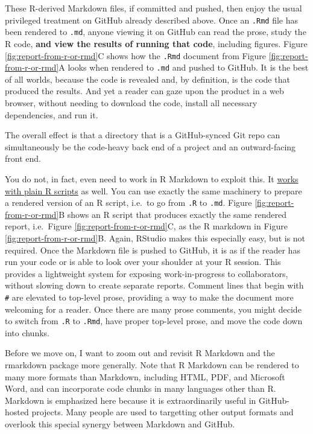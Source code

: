 \documentclass[12pt]{article}
\begin{document}
These R-derived Markdown files, if committed and pushed, then enjoy the
usual privileged treatment on GitHub already described above. Once an
\texttt{.Rmd} file has been rendered to \texttt{.md}, anyone viewing it
on GitHub can read the prose, study the R code, \textbf{and view the
results of running that code}, including figures. Figure
\ref{fig:report-from-r-or-rmd}C shows how the \texttt{.Rmd} document
from Figure \ref{fig:report-from-r-or-rmd}A looks when rendered to
\texttt{.md} and pushed to GitHub. It is the best of all worlds, because
the code is revealed and, by definition, is the code that produced the
results. And yet a reader can gaze upon the product in a web browser,
without needing to download the code, install all necessary
dependencies, and run it.

The overall effect is that a directory that is a GitHub-synced Git repo
can simultaneously be the code-heavy back end of a project and an
outward-facing front end.

You do not, in fact, even need to work in R Markdown to exploit this. It
\href{http://rmarkdown.rstudio.com/articles_report_from_r_script.html}{works
with plain R scripts} as well. You can use exactly the same machinery to
prepare a rendered version of an R script, i.e.~to go from \texttt{.R}
to \texttt{.md}. Figure \ref{fig:report-from-r-or-rmd}B shows an R
script that produces exactly the same rendered report, i.e.~Figure
\ref{fig:report-from-r-or-rmd}C, as the R markdown in Figure
\ref{fig:report-from-r-or-rmd}B. Again, RStudio makes this especially
easy, but is not required. Once the Markdown file is pushed to GitHub,
it is as if the reader has run your code or is able to look over your
shoulder at your R session. This provides a lightweight system for
exposing work-in-progress to collaborators, without slowing down to
create separate reports. Comment lines that begin with
\texttt{\#\textquotesingle{}} are elevated to top-level prose, providing
a way to make the document more welcoming for a reader. Once there are
many prose comments, you might decide to switch from \texttt{.R} to
\texttt{.Rmd}, have proper top-level prose, and move the code down into
chunks.

Before we move on, I want to zoom out and revisit R Markdown and the
rmarkdown package more generally. Note that R Markdown can be rendered
to many more formats than Markdown, including HTML, PDF, and Microsoft
Word, and can incorporate code chunks in many languages other than R.
Markdown is emphasized here because it is extraordinarily useful in
GitHub-hosted projects. Many people are used to targetting other output
formats and overlook this special synergy between Markdown and GitHub.
\end{document}
